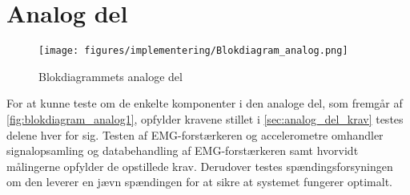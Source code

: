 \section{Analog del}
\begin{figure}[H]
\centering
\texttt{[image: figures/implementering/Blokdiagram\_analog.png]}
\caption{Blokdiagrammets analoge del}
\label{fig:blokdiagram_analog1}
\end{figure}


For at kunne teste om de enkelte komponenter i den analoge del, som fremgår af \autoref{fig:blokdiagram_analog1}, opfylder kravene stillet i \autoref{sec:analog_del_krav} testes delene hver for sig. Testen af EMG-forstærkeren og accelerometre omhandler signalopsamling og databehandling af EMG-forstærkeren samt hvorvidt målingerne opfylder de opstillede krav. Derudover testes spændingsforsyningen om den leverer en jævn spændingen for at sikre at systemet fungerer optimalt. 